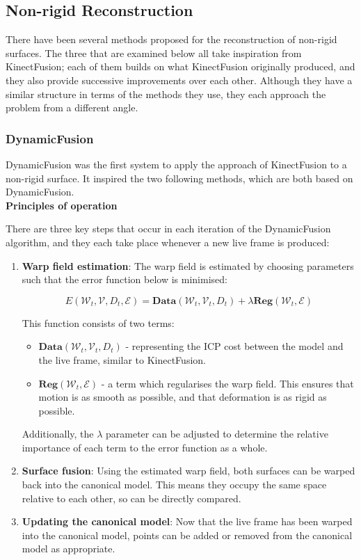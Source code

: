\documentclass[a4paper]{article}
\begin{document}
\subsection{Non-rigid Reconstruction}

There have been several methods proposed for the reconstruction of non-rigid surfaces. The three that are examined below all take inspiration from KinectFusion; each of them builds on what KinectFusion originally produced, and they also provide successive improvements over each other. Although they have a similar structure in terms of the methods they use, they each approach the problem from a different angle.

\subsubsection{DynamicFusion}

DynamicFusion was the first system to apply the approach of KinectFusion to a non-rigid surface. It inspired the two following methods, which are both based on DynamicFusion.\\ 

\noindent\textbf{Principles of operation}


There are three key steps that occur in each iteration of the DynamicFusion algorithm, and they each take place whenever a new live frame is produced:

\begin{enumerate}
\item \textbf{Warp field estimation}: The warp field is estimated by choosing parameters such that the error function below is minimised:

$$E(\mathcal{W}_t, \mathcal{V}, D_t, \mathcal{E}) = \textbf{Data}(\mathcal{W}_t, \mathcal{V}_t, D_t) + \lambda\textbf{Reg}(\mathcal{W}_t, \mathcal{E})$$ 

This function consists of two terms:
\begin{itemize}
\item $\textbf{Data}(\mathcal{W}_t, \mathcal{V}_t, D_t)$ - representing the ICP cost between the model and the live frame, similar to KinectFusion.
\item $\textbf{Reg}(\mathcal{W}_t, \mathcal{E})$ - a term which regularises the warp field. This ensures that motion is as smooth as possible, and that deformation is as rigid as possible.
\end{itemize}

Additionally, the $\lambda$ parameter can be adjusted to determine the relative importance of each term to the error function as a whole.

\item \textbf{Surface fusion}: Using the estimated warp field, both surfaces can be warped back into the canonical model. This means they occupy the same space relative to each other, so can be directly compared.

\item \textbf{Updating the canonical model}: Now that the live frame has been warped into the canonical model, points can be added or removed from the canonical model as appropriate.
\end{enumerate}
\end{document}
